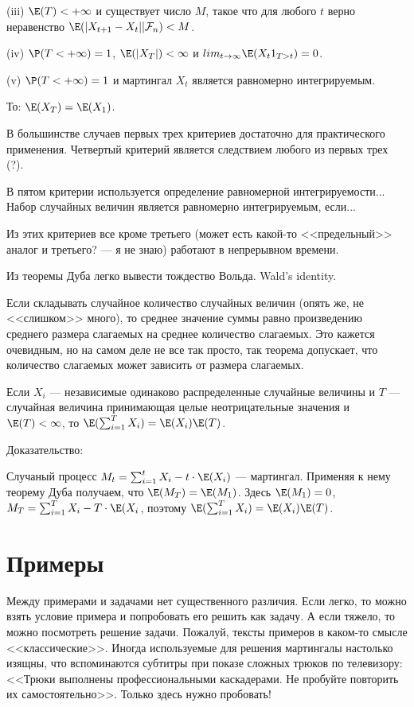 (iii) $\E(T)<+\infty$ и существует число $M$, такое что для любого $t$ верно неравенство $\E(|X_{t+1}-X_{t}||\mathcal{F}_{n})<M$.

(iv) $\P(T<+\infty)=1$, $\E(|X_{T}|)<\infty$ и $lim_{t\to\infty}\E(X_{t}1_{T>t})=0$.

(v) $\P(T<+\infty)=1$ и мартингал $X_{t}$ является равномерно интегрируемым.

То: $\E(X_{T})=\E(X_{1})$.

В большинстве случаев первых трех критериев достаточно для практического применения.
Четвертый критерий является следствием любого из первых трех (?).

В пятом критерии используется определение равномерной интегрируемости...
Набор случайных величин является равномерно интегрируемым, если...


Из этих критериев все кроме третьего (может есть какой-то <<предельный>> аналог и третьего? --- я не знаю) работают в непрерывном времени.

Из теоремы Дуба легко вывести тождество Вольда. Wald's identity.
 
Если складывать случайное количество случайных величин (опять же, не <<слишком>> много), то среднее значение суммы равно произведению среднего размера слагаемых на среднее количество слагаемых. Это кажется очевидным, но на самом деле не все так просто, так теорема допускает, что количество слагаемых может зависить от размера слагаемых.

Если $X_{i}$ --- независимые одинаково распределенные случайные величины и $T$ --- случайная величина принимающая целые неотрицательные значения и $\E(T)<\infty$, то $\E(\sum_{i=1}^{T}X_{i})=\E(X_{i})\E(T)$.

Доказательство:

Случаный процесс $M_{t}=\sum_{i=1}^{t}X_{i}-t\cdot \E(X_{i})$ --- мартингал. Применяя к нему теорему Дуба получаем, что $\E(M_{T})=\E(M_{1})$. Здесь $\E(M_{1})=0$, $M_{T}=\sum_{i=1}^{T}X_{i}-T\cdot \E(X_{i}$, поэтому $\E(\sum_{i=1}^{T}X_{i})=\E(X_{i})\E(T)$.




\section{Примеры}

Между примерами и задачами нет существенного различия. Если легко, то можно взять условие примера и попробовать его решить как задачу. А если тяжело, то можно посмотреть решение задачи. Пожалуй, тексты примеров в каком-то смысле <<классические>>. Иногда используемые для решения мартингалы настолько изящны, что вспоминаются субтитры при показе сложных трюков по телевизору: <<Трюки выполнены профессиональными каскадерами. Не пробуйте повторить их самостоятельно>>. Только здесь нужно пробовать!


